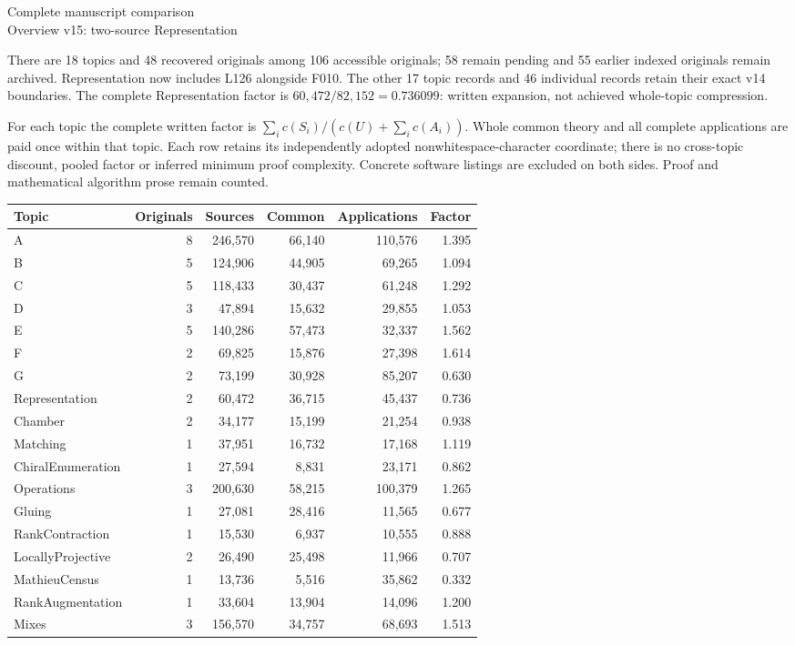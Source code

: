 \documentclass[11pt,a4paper]{article}
\begin{document}
\begin{center}{\Large Complete manuscript comparison}\\[3pt]
Overview v15: two-source Representation\end{center}
There are 18 topics and 48 recovered originals among 106 accessible originals; 58 remain pending and 55 earlier indexed originals remain archived. Representation now includes L126 alongside F010. The other 17 topic records and 46 individual records retain their exact v14 boundaries. The complete Representation factor is $60,472/82,152=0.736099$: written expansion, not achieved whole-topic compression.

For each topic the complete written factor is $\sum_i c(S_i)/(c(U)+\sum_i c(A_i))$. Whole common theory and all complete applications are paid once within that topic. Each row retains its independently adopted nonwhitespace-character coordinate; there is no cross-topic discount, pooled factor or inferred minimum proof complexity. Concrete software listings are excluded on both sides. Proof and mathematical algorithm prose remain counted.
\begin{center}\small\begin{tabular}{lrrrrr}\toprule
Topic & Originals & Sources & Common & Applications & Factor\\\midrule
A & 8 & 246,570 & 66,140 & 110,576 & 1.395 \\
B & 5 & 124,906 & 44,905 & 69,265 & 1.094 \\
C & 5 & 118,433 & 30,437 & 61,248 & 1.292 \\
D & 3 & 47,894 & 15,632 & 29,855 & 1.053 \\
E & 5 & 140,286 & 57,473 & 32,337 & 1.562 \\
F & 2 & 69,825 & 15,876 & 27,398 & 1.614 \\
G & 2 & 73,199 & 30,928 & 85,207 & 0.630 \\
Representation & 2 & 60,472 & 36,715 & 45,437 & 0.736 \\
Chamber & 2 & 34,177 & 15,199 & 21,254 & 0.938 \\
Matching & 1 & 37,951 & 16,732 & 17,168 & 1.119 \\
ChiralEnumeration & 1 & 27,594 & 8,831 & 23,171 & 0.862 \\
Operations & 3 & 200,630 & 58,215 & 100,379 & 1.265 \\
Gluing & 1 & 27,081 & 28,416 & 11,565 & 0.677 \\
RankContraction & 1 & 15,530 & 6,937 & 10,555 & 0.888 \\
LocallyProjective & 2 & 26,490 & 25,498 & 11,966 & 0.707 \\
MathieuCensus & 1 & 13,736 & 5,516 & 35,862 & 0.332 \\
RankAugmentation & 1 & 33,604 & 13,904 & 14,096 & 1.200 \\
Mixes & 3 & 156,570 & 34,757 & 68,693 & 1.513 \\
\bottomrule\end{tabular}\end{center}
\end{document}
